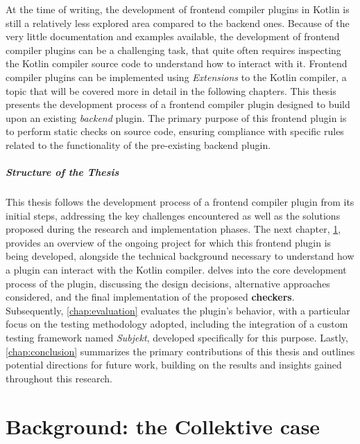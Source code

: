 \documentclass[12pt,a4paper,openright,twoside]{book}
\begin{document}
At the time of writing, the development of frontend compiler plugins in Kotlin is
still a relatively less explored area compared to the backend ones. Because of the 
very little documentation and examples available, the development of frontend 
compiler plugins can be a challenging task, that quite often requires inspecting 
the Kotlin compiler source code to understand how to interact with it.
%
Frontend compiler plugins can be implemented using \textit{Extensions} to the
Kotlin compiler, a topic that will be covered more in detail in the following
chapters. This thesis presents the development process of a frontend compiler
plugin designed to build upon an existing \textit{backend} plugin. The primary
purpose of this frontend plugin is to perform static checks on source code,
ensuring compliance with specific rules related to the functionality of the
pre-existing backend plugin.


\paragraph{Structure of the Thesis}

This thesis follows the development process of a frontend compiler plugin from
its initial steps, addressing the key challenges encountered as well as the
solutions proposed during the research and implementation phases. The next
chapter, \cref{chap:background}, provides an overview of the ongoing project for
which this frontend plugin is being developed, alongside the technical
background necessary to understand how a plugin can interact with the Kotlin
compiler.
%
 delves into the core development process of the plugin,
discussing the design decisions, alternative approaches considered, and the
final implementation of the proposed \textbf{checkers}. Subsequently,
\cref{chap:evaluation} evaluates the plugin’s behavior, with a particular focus
on the testing methodology adopted, including the integration of a custom
testing framework named \emph{Subjekt}, developed specifically for this purpose.
%
Lastly, \cref{chap:conclusion} summarizes the primary contributions of this
thesis and outlines potential directions for future work, building on the
results and insights gained throughout this research.

\chapter{Background: the Collektive case}
\label{chap:background}
\end{document}
